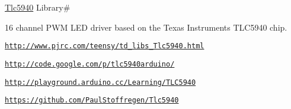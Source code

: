 \hyperlink{classTlc5940}{Tlc5940} Library\#

16 channel P\+WM L\+ED driver based on the Texas Instruments T\+L\+C5940 chip.

\href{http://www.pjrc.com/teensy/td_libs_Tlc5940.html}{\tt http\+://www.\+pjrc.\+com/teensy/td\+\_\+libs\+\_\+\+Tlc5940.\+html}

\href{http://code.google.com/p/tlc5940arduino/}{\tt http\+://code.\+google.\+com/p/tlc5940arduino/}

\href{http://playground.arduino.cc/Learning/TLC5940}{\tt http\+://playground.\+arduino.\+cc/\+Learning/\+T\+L\+C5940}

\href{https://github.com/PaulStoffregen/Tlc5940}{\tt https\+://github.\+com/\+Paul\+Stoffregen/\+Tlc5940}

 